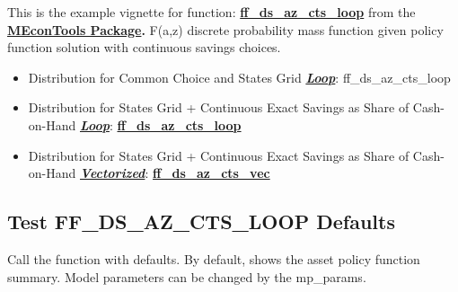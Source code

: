 \documentclass[
]{book}
\begin{document}
This is the example vignette for function:
\href{https://github.com/FanWangEcon/MEconTools/blob/master/MEconTools/vfi/ff_ds_az_cts_loop.m}{\textbf{ff\_ds\_az\_cts\_loop}}
from the \href{https://fanwangecon.github.io/MEconTools/}{\textbf{MEconTools
Package}}\textbf{.} F(a,z)
discrete probability mass function given policy function solution with
continuous savings choices.

\begin{itemize}
\item
  Distribution for Common Choice and States Grid \underline{\textbf{\emph{Loop}}}:
  ff\_ds\_az\_cts\_loop
\item
  Distribution for States Grid + Continuous Exact Savings as Share of
  Cash-on-Hand \underline{\textbf{\emph{Loop}}}:
  \href{https://github.com/FanWangEcon/MEconTools/blob/master/MEconTools/vfi/ff_ds_az_cts_loop.m}{\textbf{ff\_ds\_az\_cts\_loop}}
\item
  Distribution for States Grid + Continuous Exact Savings as Share of
  Cash-on-Hand \underline{\textbf{\emph{Vectorized}}}:
  \href{https://github.com/FanWangEcon/MEconTools/blob/master/MEconTools/vfi/ff_ds_az_cts_vec.m}{\textbf{ff\_ds\_az\_cts\_vec}}
\end{itemize}

\hypertarget{test-ff_ds_az_cts_loop-defaults}{%
\subsection{Test FF\_DS\_AZ\_CTS\_LOOP Defaults}\label{test-ff_ds_az_cts_loop-defaults}}

Call the function with defaults. By default, shows the asset policy
function summary. Model parameters can be changed by the mp\_params.
\end{document}
